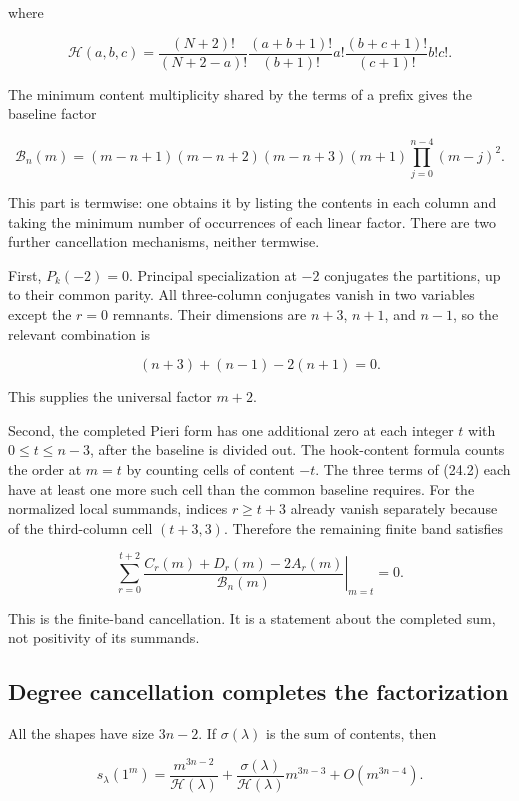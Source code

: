 \documentclass[
  10pt,
  a4paper,
  10pt,
  oneside,
  openany]{book}
\begin{document}
where

\[
 \mathcal H(a,b,c)=
 \frac{(N+2)!}{(N+2-a)!}
 \frac{(a+b+1)!}{(b+1)!}a!
 \frac{(b+c+1)!}{(c+1)!}b!c!.
\]

The minimum content multiplicity shared by the terms of a prefix gives
the baseline factor

\[
 \mathcal B_n(m)=
 (m-n+1)(m-n+2)(m-n+3)(m+1)
 \prod_{j=0}^{n-4}(m-j)^2.
 \tag{24.4}\label{eq:24.4}
\]

This part is termwise: one obtains it by listing the contents in each
column and taking the minimum number of occurrences of each linear
factor. There are two further cancellation mechanisms, neither termwise.

First, \(P_k(-2)=0\). Principal specialization at \(-2\) conjugates the
partitions, up to their common parity. All three-column conjugates
vanish in two variables except the \(r=0\) remnants. Their dimensions
are \(n+3\), \(n+1\), and \(n-1\), so the relevant combination is

\[
 (n+3)+(n-1)-2(n+1)=0.
\]

This supplies the universal factor \(m+2\).

Second, the completed Pieri form has one additional zero at each integer
\(t\) with \(0\le t\le n-3\), after the baseline is divided out. The
hook-content formula counts the order at \(m=t\) by counting cells of
content \(-t\). The three terms of (24.2) each have at least one more
such cell than the common baseline requires. For the normalized local
summands, indices \(r\ge t+3\) already vanish separately because of the
third-column cell \((t+3,3)\). Therefore the remaining finite band
satisfies

\[
 \sum_{r=0}^{t+2}
 \left.\frac{C_r(m)+D_r(m)-2A_r(m)}{\mathcal B_n(m)}\right|_{m=t}=0.
 \tag{24.5}\label{eq:24.5}
\]

This is the finite-band cancellation. It is a statement about the
completed sum, not positivity of its summands.

\subsection{Degree cancellation completes the
factorization}\label{degree-cancellation-completes-the-factorization}

All the shapes have size \(3n-2\). If \(\sigma(\lambda)\) is the sum of
contents, then

\[
 s_\lambda(1^m)=
 \frac{m^{3n-2}}{\mathcal H(\lambda)}
 +\frac{\sigma(\lambda)}{\mathcal H(\lambda)}m^{3n-3}
 +O(m^{3n-4}).
\]
\end{document}
